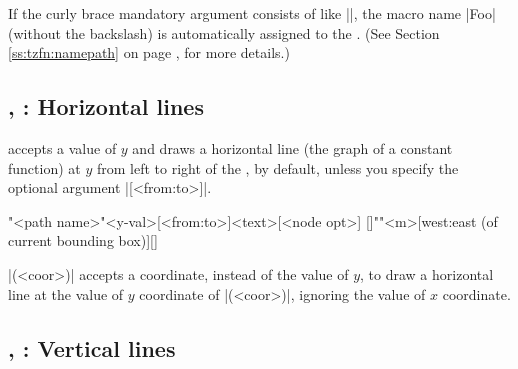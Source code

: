 \begin{tzcode}{.3}
\end{tzcode}

\remark
If the curly brace mandatory argument consists of  like |{\Foo}|, the macro name |Foo| (without the backslash) is automatically assigned to the . (See Section \ref{ss:tzfn:namepath} on page \pageref{ss:tzfn:namepath}, for more details.)

\subsection{\protect\cmd{\tzhfnat}, \protect\cmd{\tzhfn}: Horizontal lines}
\label{ssi:tzhfn}

\icmd{\tzhfnat} accepts a value of $y$ and draws a horizontal line (the graph of a constant function) at $y$ from left to right of the , by default, unless you specify the optional argument |[<from:to>]|.

\begin{tzdef}
\tzhfnat[<opt>]"<path name>"{<y-val>}[<from:to>]{<text>}[<node opt>]
  []""{<m>}[west:east (of current bounding box)]{}[]
\end{tzdef}

\icmd{\tzhfn}|(<coor>)| accepts a coordinate, instead of the value of $y$, to draw a horizontal line at the value of $y$ coordinate of |(<coor>)|, ignoring the value of $x$ coordinate.

\begin{tzcode}{.3}
\end{tzcode}


\subsection{\protect\cmd{\tzvfnat}, \protect\cmd{\tzvfn}: Vertical lines}
\label{ssi:tzvfn}

